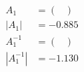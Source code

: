 
\begin{align}
A_1 & = 
\begin{pmatrix}

\end{pmatrix} \\
|A_1| & = -0.885 \\
A_1^{-1} & = 
\begin{pmatrix}

\end{pmatrix} \\
|A_1^{-1}| & = -1.130
\end{align}
